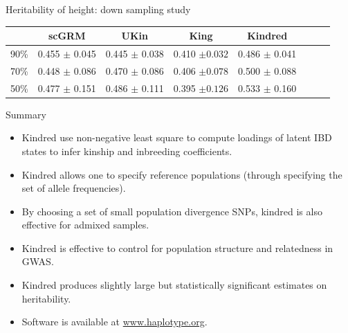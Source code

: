 \documentclass[]{beamer}
\begin{document}
\begin{frame}{Heritability of height: down sampling study}

{\small
\begin{center}
\begin{tabular}{lccccccc}
   &  {scGRM}& {UKin} & {King}    & {Kindred} \\ 
\hline
90\% & 0.455 $\pm$ 0.045 &0.445 $\pm$ 0.038 &0.410 $\pm 0.032$ &0.486 $\pm$ 0.041\\
70\% & 0.448 $\pm$ 0.086 &0.470 $\pm$ 0.086 &0.406 $\pm 0.078$ &0.500 $\pm$ 0.088\\
50\% & 0.477 $\pm$ 0.151 &0.486 $\pm$ 0.111 &0.395 $\pm 0.126$ &0.533 $\pm$ 0.160\\
\hline
\end{tabular}
\end{center}
}
\end{frame}




\begin{frame}{Summary}
\begin{itemize}
\item Kindred use non-negative least square to compute loadings of latent IBD states to infer kinship and inbreeding coefficients. 
\item Kindred allows one to specify reference populations (through specifying the set of allele frequencies). 
\item By choosing a set of small population divergence SNPs, kindred is also effective for admixed samples. 
\item Kindred is effective to control for population structure and relatedness in GWAS. 
\item Kindred produces slightly large but statistically significant estimates on heritability. 
\item Software is available at \url{www.haplotype.org}. 
\end{itemize}

\end{frame}
\end{document}

